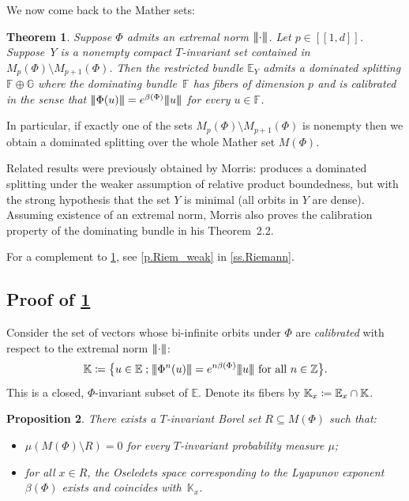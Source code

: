 \documentclass[JEP,XML,SOM,Unicode]{cedram}
\newcommand{\ldbrack}{[\![}
\newcommand{\rdbrack}{]\!]}
\def\vcentcolon{\mathrel{\mathop\ordinarycolon}}
\providecommand\ordinarycolon{:}
\providecommand*\coloneqq{\vcentcolon\mathrel{\mkern-1.2mu}=}
\theoremstyle{plain}
\newtheorem{theorem}{Theorem}[section]
\newtheorem{proposition}[theorem]{Proposition}
\theoremstyle{definition}
\newcommand{\tribar}[1]{\mathopen{| {\kern -1.5pt} | {\kern -1.5pt} |} {#1}
\mathclose{| {\kern -1.5pt} | {\kern -1.5pt} |}}
\newcommand{\ZZ}{\mathbb{Z}}
\newcommand{\EE}{\mathbb{E}}
\newcommand{\FF}{\mathbb{F}}
\newcommand{\GG}{\mathbb{G}}
\newcommand{\KK}{\mathbb{K}}
\newcommand{\st}{\;\mathord{;}\;}
\begin{document}
We now come back to the Mather sets:

\begin{theorem}\label{t.dom}
Suppose $\Phi$ admits an extremal norm $\tribar{\cdot}$.
Let $p \in \ldbrack 1, d \rdbrack$.
Suppose~$Y$ is a nonempty compact $T$-invariant set contained in $M_p(\Phi) \setminus M_{p+1}(\Phi)$.
Then the restricted bundle $\EE_Y$ admits a dominated splitting $\FF \oplus \GG$ where the dominating bundle~$\FF$ has fibers of dimension $p$ and is calibrated in the sense that $\tribar{\Phi(u)} = e^{\beta(\Phi)} \tribar{u}$ for every $u \in \FF$.
\end{theorem}

In particular, if exactly one of the sets $M_p(\Phi) \setminus M_{p+1}(\Phi)$ is nonempty then we obtain a dominated splitting over the whole Mather set $M(\Phi)$.

Related results were previously obtained by Morris: \cite[Th.\,2.1]{Morris_rapidly} produces a dominated splitting under the weaker assumption of relative product boundedness, but with the strong hypothesis that the set $Y$ is minimal (\ie all orbits in $Y$ are dense). Assuming existence of an extremal norm, Morris also proves the calibration property of the dominating bundle in his Theorem~2.2.

For a complement to \cref{t.dom}, see \cref{p.Riem_weak} in \cref{ss.Riemann}.

\subsection{Proof of \texorpdfstring{\cref{t.dom}}{the domination theorem}}

Consider the set of vectors whose bi-infinite orbits under $\Phi$ are \emph{calibrated} with respect to the extremal norm $\tribar{\mathord{\cdot}}$:
\begin{equation}\label{e.calibrated}
\KK \coloneqq \big\{ u \in \EE \st \tribar{\Phi^n(u)} = e^{n \beta(\Phi)}\tribar{u} \text{ for all } n \in \ZZ \big\}.
\end{equation}
This is a closed, $\Phi$-invariant subset of $\EE$.
Denote its fibers by $\KK_x \coloneqq \EE_x \cap \KK$.

\begin{proposition}\label{p.Oseledets}
There exists a $T$-invariant Borel set $R \subseteq M(\Phi)$ such that:
\begin{itemize}
\item $\mu ( M(\Phi) \setminus R ) = 0$ for every $T$-invariant probability measure $\mu$;
\item for all $x \in R$, the Oseledets space corresponding to the Lyapunov exponent $\beta(\Phi)$ exists and coincides with~$\KK_x$.
\end{itemize}
\end{proposition}
\end{document}
